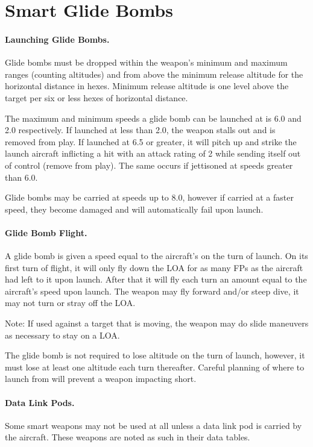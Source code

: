 \section{Smart Glide Bombs}

\paragraph{Launching Glide Bombs.} Glide bombs must be dropped within the weapon's minimum and maximum ranges (counting altitudes) and from above the minimum release altitude for the horizontal distance in hexes. Minimum release altitude is one level above the target per six or less hexes of horizontal distance.

The maximum and minimum speeds a glide bomb can be launched at is 6.0 and 2.0 respectively. If launched at less than 2.0, the weapon stalls out and is removed from play. If launched at 6.5 or greater, it will pitch up and strike the launch aircraft inflicting a hit with an attack rating of 2 while sending itself out of control (remove from play). The same occurs if jettisoned at speeds greater than 6.0.

Glide bombs may be carried at speeds up to 8.0, however if carried at a faster speed, they become damaged and will automatically fail upon launch.

\paragraph{Glide Bomb Flight.} A glide bomb is given a speed equal to the aircraft's on the turn of launch. On its first turn of flight, it will only fly down the LOA for as many FPs as the aircraft had left to it upon launch. After that it will fly each turn an amount equal to the aircraft's speed upon launch. The weapon may fly forward and/or steep dive, it may not turn or stray off the LOA.

Note: If used against a target that is moving, the weapon may do slide maneuvers as necessary to stay on a LOA.

The glide bomb is not required to lose altitude on the turn of launch, however, it must lose at least one altitude each turn thereafter. Careful planning of where to launch from will prevent a weapon impacting short.

\paragraph{Data Link Pods.} Some smart weapons may not be used at all unless a data link pod is carried by the aircraft. These weapons are noted as such in their data tables.

